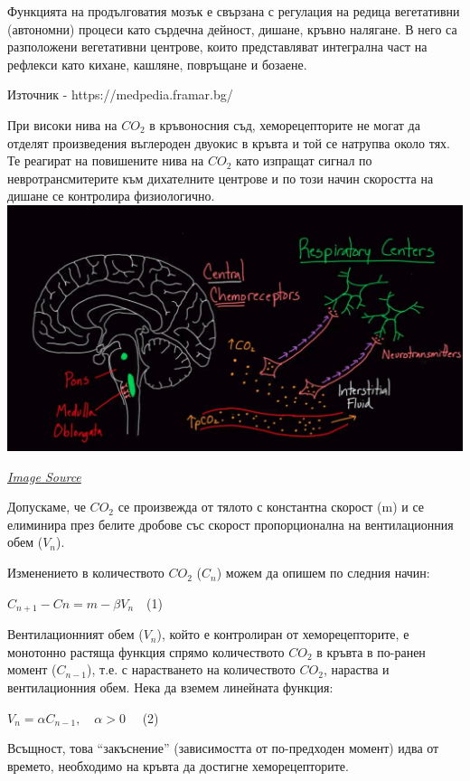 \documentclass[11pt]{article}
\makeatletter
\def\maxwidth{\ifdim\Gin@nat@width>\linewidth\linewidth
    \else\Gin@nat@width\fi}
\let\Oldincludegraphics\includegraphics
\renewcommand{\includegraphics}[1]{\Oldincludegraphics[width=.8\maxwidth]{#1}}
\makeatother
\begin{document}
Функцията на продълговатия мозък е свързана с регулация на редица
вегетативни (автономни) процеси като сърдечна дейност, дишане, кръвно
налягане. В него са разположени вегетативни центрове, които
представляват интегрална част на рефлекси като кихане, кашляне,
повръщане и бозаене.

Източник - https://medpedia.framar.bg/

    При високи нива на \(CO_2\) в кръвоносния съд, хеморецепторите не могат
да отделят произведения въглероден двуокис в кръвта и той се натрупва
около тях. Те реагират на повишените нива на \(CO_2\) като изпращат
сигнал по невротрансмитерите към дихателните центрове и по този начин
скоростта на дишане се контролира физиологично.
\includegraphics{img/central_chemoreceptors_high_CO2.jpg}

\emph{\href{https://www.youtube.com/watch?v=lVacrVMmJX8}{Image Source}}

    Допускаме, че \(CO_2\) се произвежда от тялото с константна скорост (m)
и се елиминира през белите дробове със скорост пропорционална на
вентилационния обем (\(V_n\)).

Изменението в количеството \(CO_2\) (\(C_n\)) можем да опишем по следния
начин:

\(C_{n+1} - C{n} = m - \beta V_n \quad\)(1)

Вентилационният обем (\(V_n\)), който е контролиран от хеморецепторите,
е монотонно растяща функция спрямо количеството \(CO_2\) в кръвта в
по-ранен момент (\(C_{n-1}\)), т.е. с нарастването на количеството
\(CO_2\), нараства и вентилационния обем. Нека да вземем линейната
функция:

\(V_{n} = \alpha C_{n-1}, \quad \alpha > 0 \quad\) (2)

Всъщност, това ``закъснение'' (зависимостта от по-предходен момент) идва
от времето, необходимо на кръвта да достигне хеморецепторите.
\end{document}
